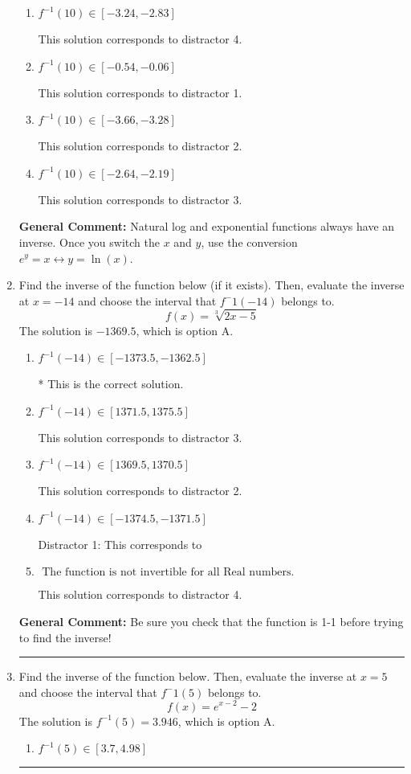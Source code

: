 \documentclass{extbook}[14pt]
\newcommand{\litem}[1]{\item #1

\rule{\textwidth}{0.4pt}}
\begin{document}
\begin{enumerate}
{\begin{enumerate}[label=\Alph*.]
 This is the solution.
\item \( f^{-1}(10) \in [-3.24, -2.83] \)

 This solution corresponds to distractor 4.
\item \( f^{-1}(10) \in [-0.54, -0.06] \)

 This solution corresponds to distractor 1.
\item \( f^{-1}(10) \in [-3.66, -3.28] \)

 This solution corresponds to distractor 2.
\item \( f^{-1}(10) \in [-2.64, -2.19] \)

 This solution corresponds to distractor 3.
\end{enumerate}

\textbf{General Comment:} Natural log and exponential functions always have an inverse. Once you switch the $x$ and $y$, use the conversion $ e^y = x \leftrightarrow y=\ln(x)$.
}
\litem{
Find the inverse of the function below (if it exists). Then, evaluate the inverse at $x = -14$ and choose the interval that $f^-1(-14)$ belongs to.
\[ f(x) = \sqrt[3]{2 x - 5} \]The solution is \( -1369.5 \), which is option A.\begin{enumerate}[label=\Alph*.]
\item \( f^{-1}(-14) \in [-1373.5, -1362.5] \)

* This is the correct solution.
\item \( f^{-1}(-14) \in [1371.5, 1375.5] \)

 This solution corresponds to distractor 3.
\item \( f^{-1}(-14) \in [1369.5, 1370.5] \)

 This solution corresponds to distractor 2.
\item \( f^{-1}(-14) \in [-1374.5, -1371.5] \)

 Distractor 1: This corresponds to 
\item \( \text{ The function is not invertible for all Real numbers. } \)

 This solution corresponds to distractor 4.
\end{enumerate}

\textbf{General Comment:} Be sure you check that the function is 1-1 before trying to find the inverse!
}
\litem{
Find the inverse of the function below. Then, evaluate the inverse at $x = 5$ and choose the interval that $f^-1(5)$ belongs to.
\[ f(x) = e^{x-2}-2 \]The solution is \( f^{-1}(5) = 3.946 \), which is option A.\begin{enumerate}[label=\Alph*.]
\item \( f^{-1}(5) \in [3.7, 4.98] \)


\end{enumerate}}
\end{enumerate}
\end{document}
